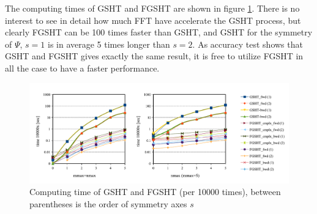 The computing times of GSHT and FGSHT are shown in figure \ref{fig:time-gsht-fgsht}.
There is no interest to see in detail how much FFT have accelerate
the GSHT process, but clearly FGSHT can be 100 times faster than GSHT,
and GSHT for the symmetry of $\Psi$, $s=1$ is in average 5 times
longer than $s=2$. As accuracy test shows that GSHT and FGSHT gives
exactly the same result, it is free to utilize FGSHT in all the case
to have a faster performance.
\begin{center}
\begin{figure}[H]
\begin{centering}
\includegraphics[bb=0bp 20bp 731bp 263bp,width=1\columnwidth]{_figure/results/fgsht_perf}
\par\end{centering}
\caption{Computing time of GSHT and FGSHT (per 10000 times), between parentheses
is the order of symmetry axes $s$\label{fig:time-gsht-fgsht}}
\end{figure}
\par\end{center}

